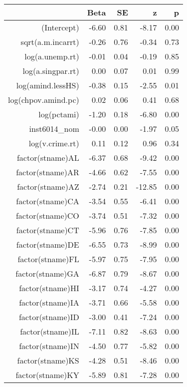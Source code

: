 \begin{table}[ht]
\centering
\begin{tabular}{rrrrr}
  \hline
 & Beta & SE & z & p \\ 
  \hline
(Intercept) & -6.60 & 0.81 & -8.17 & 0.00 \\ 
  sqrt(a.m.incarrt) & -0.26 & 0.76 & -0.34 & 0.73 \\ 
  log(a.unemp.rt) & -0.01 & 0.04 & -0.19 & 0.85 \\ 
  log(a.singpar.rt) & 0.00 & 0.07 & 0.01 & 0.99 \\ 
  log(amind.lessHS) & -0.38 & 0.15 & -2.55 & 0.01 \\ 
  log(chpov.amind.pc) & 0.02 & 0.06 & 0.41 & 0.68 \\ 
  log(pctami) & -1.20 & 0.18 & -6.80 & 0.00 \\ 
  inst6014\_nom & -0.00 & 0.00 & -1.97 & 0.05 \\ 
  log(v.crime.rt) & 0.11 & 0.12 & 0.96 & 0.34 \\ 
  factor(stname)AL & -6.37 & 0.68 & -9.42 & 0.00 \\ 
  factor(stname)AR & -4.66 & 0.62 & -7.55 & 0.00 \\ 
  factor(stname)AZ & -2.74 & 0.21 & -12.85 & 0.00 \\ 
  factor(stname)CA & -3.54 & 0.55 & -6.41 & 0.00 \\ 
  factor(stname)CO & -3.74 & 0.51 & -7.32 & 0.00 \\ 
  factor(stname)CT & -5.96 & 0.76 & -7.85 & 0.00 \\ 
  factor(stname)DE & -6.55 & 0.73 & -8.99 & 0.00 \\ 
  factor(stname)FL & -5.97 & 0.75 & -7.95 & 0.00 \\ 
  factor(stname)GA & -6.87 & 0.79 & -8.67 & 0.00 \\ 
  factor(stname)HI & -3.17 & 0.74 & -4.27 & 0.00 \\ 
  factor(stname)IA & -3.71 & 0.66 & -5.58 & 0.00 \\ 
  factor(stname)ID & -3.00 & 0.41 & -7.24 & 0.00 \\ 
  factor(stname)IL & -7.11 & 0.82 & -8.63 & 0.00 \\ 
  factor(stname)IN & -4.50 & 0.77 & -5.82 & 0.00 \\ 
  factor(stname)KS & -4.28 & 0.51 & -8.46 & 0.00 \\ 
  factor(stname)KY & -5.89 & 0.81 & -7.28 & 0.00 \\ 

\end{tabular}
\end{table}
